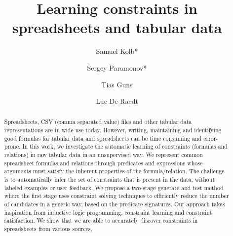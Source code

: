 






\title{Learning constraints in spreadsheets and tabular data}

\author{Samuel Kolb* \and Sergey Paramonov* \and Tias Guns \and Luc De Raedt}

\maketitle

\begin{abstract}
Spreadsheets, CSV (comma separated value) files and other tabular data representations are in wide use today.
However, writing, maintaining and identifying good formulas for tabular data and spreadsheets can be time consuming and error-prone.
In this work, we investigate the automatic learning of constraints (formulas and relations) in raw tabular data in an unsupervised way.
We represent common spreadsheet formulas and relations through predicates and expressions whose arguments must satisfy the inherent properties of the formula/relation. The challenge is to automatically infer the set of constraints that is present in the data, without labeled examples or user feedback. 
We propose a two-stage generate and test method where the first stage uses constraint solving techniques to efficiently reduce the number of candidates in a generic way, based on the predicate signatures. 
Our approach takes inspiration from inductive logic programming, constraint learning and constraint satisfaction.
We show that we are able to accurately discover constraints in spreadsheets from various sources.
\end{abstract}

